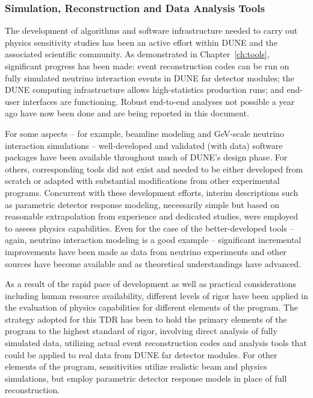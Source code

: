 \subsubsection{Simulation, Reconstruction and Data Analysis Tools}
\label{sec:exec-assm-meth-simreco}

The development of algorithms and software infrastructure needed
to carry out physics sensitivity studies has been an active 
effort within DUNE and the associated scientific community.  
As demonstrated in Chapter~\ref{ch:tools}, significant progress 
has been made: event reconstruction 
codes can be run on fully simulated neutrino interaction events 
in DUNE far detector modules; the DUNE computing infrastructure 
allows high-statistics production runs; and end-user interfaces 
are functioning.  Robust end-to-end analyses not 
possible a year ago have now been done and are being 
reported in this document.

For some aspects -- for example, beamline modeling
and GeV-scale neutrino interaction simulations --
well-developed and validated (with data) software packages have
been available throughout much of DUNE's design phase.
For others, corresponding tools did not exist and needed to be
either developed from scratch or adapted with substantial
modifications from other experimental programs.  Concurrent
with these development efforts, interim descriptions such
as parametric detector response modeling, necessarily simple
but based on reasonable extrapolation from experience and
dedicated studies, were employed to assess physics capabilities.
Even for the case of the better-developed tools -- again, neutrino 
interaction modeling is a good example -- significant incremental
improvements have been made as data from neutrino experiments
and other sources have become available and as theoretical
understandings have advanced.

As a result of the rapid pace of development as well as 
practical considerations including human 
resource availability, different levels
of rigor have been applied in the evaluation of physics capabilities for different elements of the program.  
The strategy adopted for
this TDR has been to hold the primary elements of the program
to the highest standard of rigor, involving direct analysis
of fully simulated data, utilizing actual event reconstruction
codes and analysis tools that could be applied to real data
from DUNE far detector modules.  For other elements of the
program, sensitivities utilize realistic beam and
physics simulations, but employ parametric detector
response models in place of full reconstruction.

